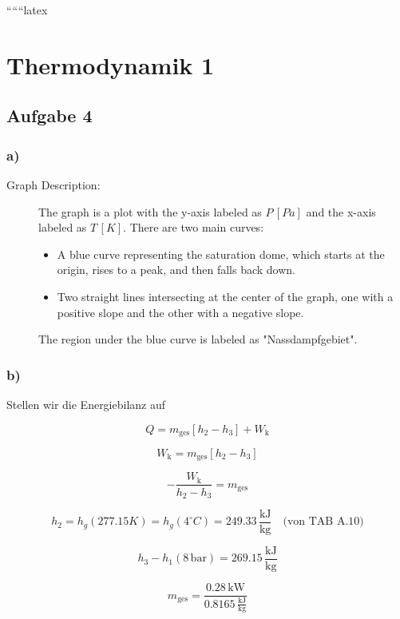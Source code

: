 
``````latex


\section*{Thermodynamik 1}

\subsection*{Aufgabe 4}

\subsubsection*{a)}

\begin{description}
    \item[Graph Description:] The graph is a plot with the y-axis labeled as \( P \, [Pa] \) and the x-axis labeled as \( T \, [K] \). There are two main curves:
    \begin{itemize}
        \item A blue curve representing the saturation dome, which starts at the origin, rises to a peak, and then falls back down.
        \item Two straight lines intersecting at the center of the graph, one with a positive slope and the other with a negative slope.
    \end{itemize}
    The region under the blue curve is labeled as "Nassdampfgebiet".
\end{description}

\subsubsection*{b)}

Stellen wir die Energiebilanz auf

\[
Q = m_{\text{ges}} \left[ h_2 - h_3 \right] + W_{\text{k}}
\]

\[
W_{\text{k}} = m_{\text{ges}} \left[ h_2 - h_3 \right]
\]

\[
-\frac{W_{\text{k}}}{h_2 - h_3} = m_{\text{ges}}
\]

\[
h_2 = h_g (277.15 K) = h_g (4^\circ C) = 249.33 \, \frac{\text{kJ}}{\text{kg}} \quad \text{(von TAB A.10)}
\]

\[
h_3 - h_1 (8 \, \text{bar}) = 269.15 \, \frac{\text{kJ}}{\text{kg}}
\]

\[
m_{\text{ges}} = \frac{0.28 \, \text{kW}}{0.8165 \, \frac{\text{kJ}}{\text{kg}}}
\]

